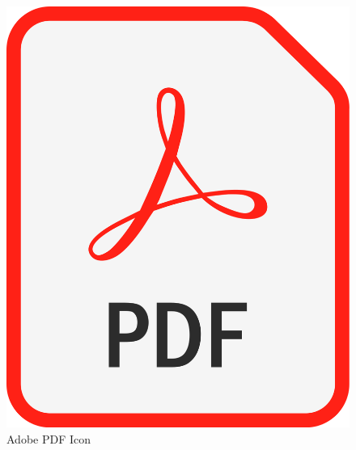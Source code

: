 \begin{figure}[]
	\centering
	\includegraphics[scale=0.1]{"images/PDFfileIcon.png"}
	\caption{Adobe PDF Icon \cite{wiki-pdf-engl}}
\end{figure}
